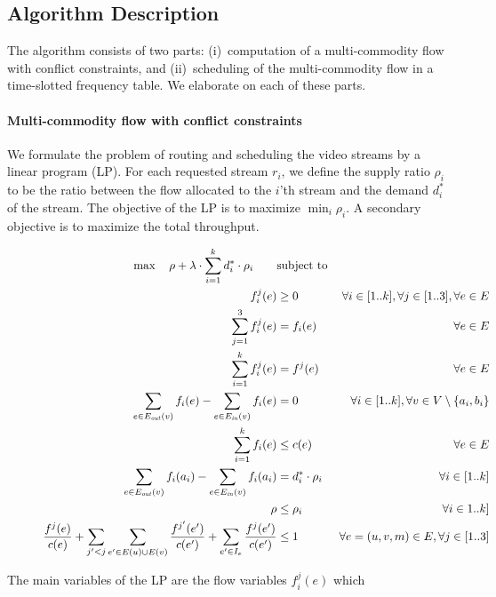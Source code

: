 \documentclass[12pt]{article}
\newenvironment{proof sketch}[1]{\noindent {\emph{Proof sketch of #1:}}}{\hfill \qed}
\newcommand{\Ein}{E_{\text{\emph{in}}}}
\newcommand{\Eout}{E_{\text{\emph{out}}}}
\begin{document}
\subsection{Algorithm Description}
The algorithm consists of two parts: (i)~computation of a
multi-commodity flow with conflict constraints, and (ii)~scheduling of
the multi-commodity flow in a time-slotted frequency table.
We elaborate on each of these parts.

\paragraph{Multi-commodity flow with conflict constraints}
We formulate the problem of routing and scheduling the video streams
by a linear program (LP).  For each requested stream $r_i$, we define
the supply ratio $\rho_i$ to be the ratio between the flow allocated
to the $i$'th stream and the demand $d^*_i$ of the stream.  The
objective of the LP is to maximize $\min_i \rho_i$.  A secondary
objective is to maximize the total throughput.
\begin{figure}
  \begin{align}
    \max ~~~\rho + \lambda \cdot\sum_{i=1}^k d^*_i \cdot \rho_i~~~~~~&\text{subject to}&\\
    f^j_i(e) &\geq 0&\forall i\in [1..k], \forall j\in [1..3], \forall e\in E \label{eq:pos}\\
    \sum_{j=1}^3 f_i^j(e) &=f_i(e)& \forall e\in E\label{eq:freq1}\\
    \sum_{i=1}^k f_i^j(e) &=f^j(e)& \forall e\in E\label{eq:freq2}\\
    \sum_{e \in \Eout (v)} f_i(e) - \sum_{e \in \Ein (v)} f_i(e) &=0 &\forall i\in [1..k],\forall v\in V\setminus \{a_i,b_i\}\label{eq:conservation}\\
    \sum_{i=1}^k f_i(e) &\leq c(e) &\forall e\in E \label{eq:cap}\\
    \sum_{e \in \Eout (v)} f_i(a_i) - \sum_{e \in \Ein (v)} f_i(a_i)&=d^*_i \cdot \rho_i &\forall i\in [1..k]\label{eq:rho_i}\\
    \rho &\leq \rho_i&\forall i\in 1..k]\label{eq:rho}\\
    \frac{f^j(e)}{c(e)} + \sum_{j'< j} \sum_{e'\in E(u)\cup E(v)}
    \frac{f^{j'}(e')}{c(e')} + \sum_{e' \in I_{e}}
    \frac{f^j(e')}{c(e')} & \leq 1 & \forall e=(u,v,m)\in E,\forall
    j\in[1..3] \label{eq:conf}
  \end{align}
\end{figure}
The main variables of the LP are the flow variables $f_i^j(e)$ which
\end{document}
